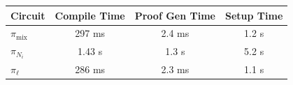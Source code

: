 \begin{tabular}{lccc}
\toprule
\textbf{Circuit} & \textbf{Compile Time} & \textbf{Proof Gen Time} & \textbf{Setup Time} \\
\midrule
$\pi_{\text{mix}}$ & 297 ms & 2.4 ms & 1.2 s \\
$\pi_{N_i}$ & 1.43 s & 1.3 s & 5.2 s \\
$\pi_\ell$ & 286 ms & 2.3 ms & 1.1 s \\
\bottomrule
\end{tabular}
